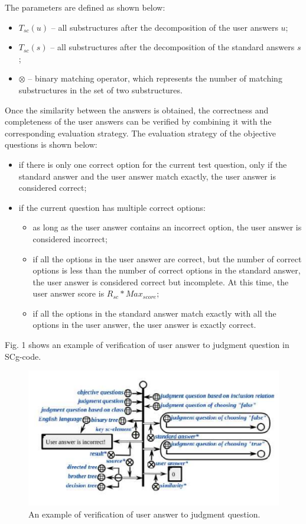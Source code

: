 \documentclass{article}
\begin{document}
The parameters are defined as shown below:
\begin{itemize}
    \item $ T_{sc}(u)$ --  all substructures after the decomposition of the user answers $u$;
    \item $ T_{sc}(s)$ -- all substructures after the decomposition of the standard answers $s$;
    \item $\otimes$ -- binary matching operator, which represents the number of matching substructures in the set of two substructures.
\end{itemize}

Once the similarity between the answers is obtained, the
correctness and completeness of the user answers can be
verified by combining it with the corresponding evaluation
strategy. The evaluation strategy of the objective questions
is shown below:
\begin{itemize}
   \item if there is only one correct option for the current test question, only if the standard answer and the user answer match exactly, the user answer is considered correct;
   \item if the current question has multiple correct options:
        \begin{itemize}
            \item as long as the user answer contains an incorrect option, the user answer is considered incorrect;
            \item  if all the options in the user answer are correct, but the number of correct options is less than the number of correct options in the standard answer, the user answer is considered correct but incomplete. At this time, the user answer score is $R_{sc}*Max_{score}$;
            \item if all the options in the standard answer match exactly with all the options in the user answer, the user answer is exactly correct.
        \end{itemize}
\end{itemize}

Fig. 1 shows an example of verification of user answer
to judgment question in SCg-code.

\small\begin{figure}[h]
    \centering
    \includegraphics{picture.png}
    \caption  {An example of verification of user answer to judgment question.}
    \label{fig:mpr}
\end{figure}
\end{document}
